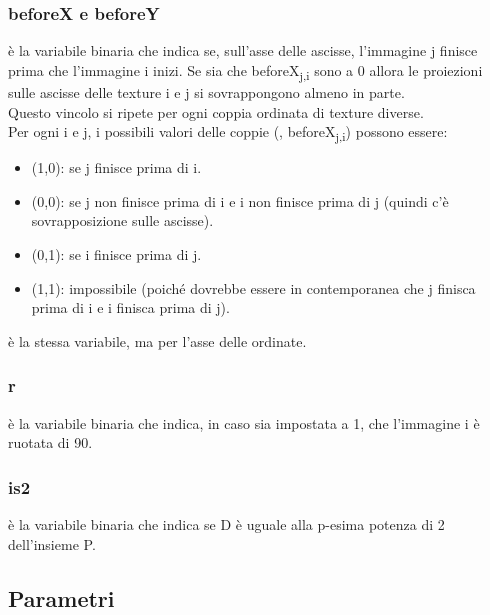 \subsubsection{beforeX e beforeY}



\beforeXij{} è la variabile binaria che indica se, sull'asse delle ascisse, l'immagine j finisce prima che l'immagine i inizi. Se sia \beforeXij{} che beforeX\textsubscript{j,i} sono a 0 allora le proiezioni sulle ascisse delle texture i e j si sovrappongono almeno in parte. \\
Questo vincolo si ripete per ogni coppia ordinata di texture diverse. \\
Per ogni i e j, i possibili valori delle coppie (\beforeXij, beforeX\textsubscript{j,i}) possono essere:
\begin{itemize}
	\itemsep0em
	\item (1,0): se j finisce prima di i.
	\item (0,0): se j non finisce prima di i e i non finisce prima di j (quindi c'è sovrapposizione sulle ascisse).
	\item (0,1): se i finisce prima di j.
	\item (1,1): impossibile (poiché dovrebbe essere in contemporanea che j finisca prima di i e i finisca prima di j).
\end{itemize}
\beforeYij{} è la stessa variabile, ma per l'asse delle ordinate.


\subsubsection{r}

{\ri} è la variabile binaria che indica, in caso sia impostata a 1, che l'immagine i è ruotata di 90\degree.

\subsubsection{is2}
\isTp{} è la variabile binaria che indica se D è uguale alla p-esima potenza di 2 dell'insieme P.








\subsection{Parametri}

